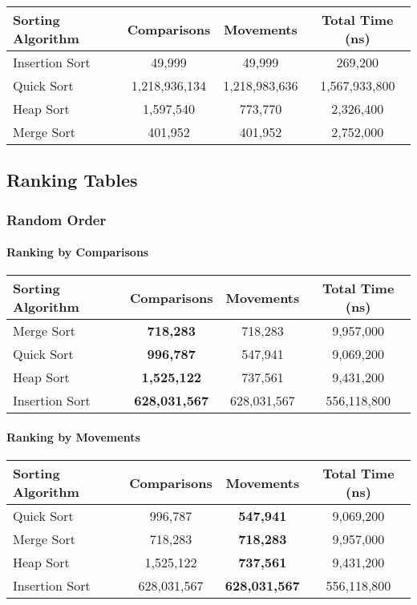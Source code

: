 \documentclass{article}
\begin{document}
\begin{longtable}{lccc}
\toprule
\textbf{Sorting Algorithm} & \textbf{Comparisons} & \textbf{Movements} & \textbf{Total Time (ns)} \\
\midrule
Insertion Sort & 49,999        & 49,999        & 269,200      \\
Quick Sort     & 1,218,936,134 & 1,218,983,636 & 1,567,933,800 \\
Heap Sort      & 1,597,540     & 773,770       & 2,326,400    \\
Merge Sort     & 401,952       & 401,952       & 2,752,000    \\
\bottomrule
\end{longtable}

\subsection{Ranking Tables}

\subsubsection{Random Order}

\paragraph{Ranking by Comparisons}

\begin{longtable}{lccc}
\toprule
\textbf{Sorting Algorithm} & \textbf{Comparisons} & \textbf{Movements} & \textbf{Total Time (ns)} \\
\midrule
Merge Sort     & \textbf{718,283}     & 718,283     & 9,957,000   \\
Quick Sort     & \textbf{996,787}     & 547,941     & 9,069,200   \\
Heap Sort      & \textbf{1,525,122}   & 737,561     & 9,431,200   \\
Insertion Sort & \textbf{628,031,567} & 628,031,567 & 556,118,800 \\
\bottomrule
\end{longtable}

\paragraph{Ranking by Movements}

\begin{longtable}{lccc}
\toprule
\textbf{Sorting Algorithm} & \textbf{Comparisons} & \textbf{Movements} & \textbf{Total Time (ns)} \\
\midrule
Quick Sort     & 996,787     & \textbf{547,941}     & 9,069,200   \\
Merge Sort     & 718,283     & \textbf{718,283}     & 9,957,000   \\
Heap Sort      & 1,525,122   & \textbf{737,561}     & 9,431,200   \\
Insertion Sort & 628,031,567 & \textbf{628,031,567} & 556,118,800 \\
\bottomrule
\end{longtable}
\end{document}
